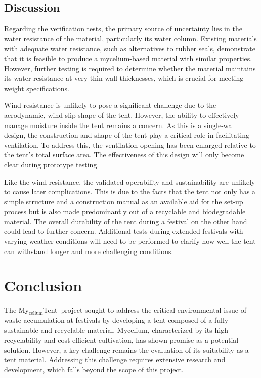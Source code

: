 \documentclass{article}
\newcommand{\myc}{My$_{\text{celium}}$Tent}
\begin{document}
\subsection{Discussion}
Regarding the verification tests, the primary source of uncertainty lies in the water
resistance of the material, particularly its water column. Existing materials with
adequate water resistance, such as alternatives to rubber seals, demonstrate that it is
feasible to produce a mycelium-based material with similar properties. However, further
testing is required to determine whether the material maintains its water resistance at
very thin wall thicknesses, which is crucial for meeting weight specifications.

Wind resistance is unlikely to pose a significant challenge due to the aerodynamic,
wind-slip shape of the tent. However, the ability to effectively manage moisture inside
the tent remains a concern. As this is a single-wall design, the construction and shape
of the tent play a critical role in facilitating ventilation. To address this, the
ventilation opening has been enlarged relative to the tent's total surface area. The
effectiveness of this design will only become clear during prototype testing.

Like the wind resistance, the validated operability and sustainability are unlikely to
cause later complications. This is due to the facts that the tent not only has a simple
structure and a construction manual as an available aid for the set-up process but is also
made predominantly out of a recyclable and biodegradable material. The overall durability
of the tent during a festival on the other hand could lead to further concern. Additional
tests during extended festivals with varying weather conditions will need to be performed
to clarify how well the tent can withstand longer and more challenging conditions.

\section{Conclusion}
The \myc\ project sought to address the critical environmental issue of waste
accumulation at festivals by developing a tent composed of a fully sustainable and
recyclable material. Mycelium, characterized by its high recyclability and cost-efficient
cultivation, has shown promise as a potential solution. However, a key challenge remains
the evaluation of its suitability as a tent material. Addressing this challenge requires
extensive research and development, which falls beyond the scope of this project.
\end{document}
